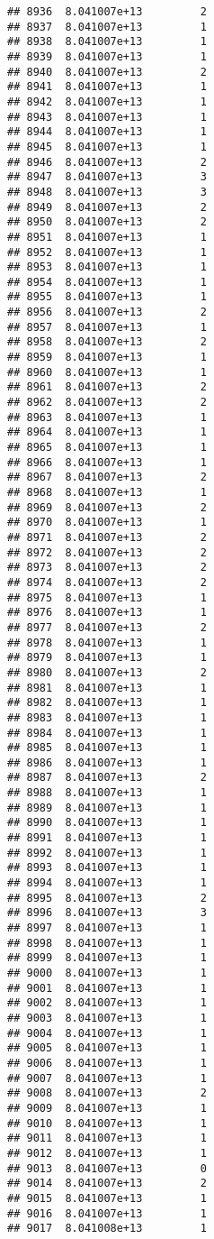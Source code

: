 \documentclass[
]{article}
\begin{document}
\begin{verbatim}
## 8936  8.041007e+13         2
## 8937  8.041007e+13         1
## 8938  8.041007e+13         1
## 8939  8.041007e+13         1
## 8940  8.041007e+13         2
## 8941  8.041007e+13         1
## 8942  8.041007e+13         1
## 8943  8.041007e+13         1
## 8944  8.041007e+13         1
## 8945  8.041007e+13         1
## 8946  8.041007e+13         2
## 8947  8.041007e+13         3
## 8948  8.041007e+13         3
## 8949  8.041007e+13         2
## 8950  8.041007e+13         2
## 8951  8.041007e+13         1
## 8952  8.041007e+13         1
## 8953  8.041007e+13         1
## 8954  8.041007e+13         1
## 8955  8.041007e+13         1
## 8956  8.041007e+13         2
## 8957  8.041007e+13         1
## 8958  8.041007e+13         2
## 8959  8.041007e+13         1
## 8960  8.041007e+13         1
## 8961  8.041007e+13         2
## 8962  8.041007e+13         2
## 8963  8.041007e+13         1
## 8964  8.041007e+13         1
## 8965  8.041007e+13         1
## 8966  8.041007e+13         1
## 8967  8.041007e+13         2
## 8968  8.041007e+13         1
## 8969  8.041007e+13         2
## 8970  8.041007e+13         1
## 8971  8.041007e+13         2
## 8972  8.041007e+13         2
## 8973  8.041007e+13         2
## 8974  8.041007e+13         2
## 8975  8.041007e+13         1
## 8976  8.041007e+13         1
## 8977  8.041007e+13         2
## 8978  8.041007e+13         1
## 8979  8.041007e+13         1
## 8980  8.041007e+13         2
## 8981  8.041007e+13         1
## 8982  8.041007e+13         1
## 8983  8.041007e+13         1
## 8984  8.041007e+13         1
## 8985  8.041007e+13         1
## 8986  8.041007e+13         1
## 8987  8.041007e+13         2
## 8988  8.041007e+13         1
## 8989  8.041007e+13         1
## 8990  8.041007e+13         1
## 8991  8.041007e+13         1
## 8992  8.041007e+13         1
## 8993  8.041007e+13         1
## 8994  8.041007e+13         1
## 8995  8.041007e+13         2
## 8996  8.041007e+13         3
## 8997  8.041007e+13         1
## 8998  8.041007e+13         1
## 8999  8.041007e+13         1
## 9000  8.041007e+13         1
## 9001  8.041007e+13         1
## 9002  8.041007e+13         1
## 9003  8.041007e+13         1
## 9004  8.041007e+13         1
## 9005  8.041007e+13         1
## 9006  8.041007e+13         1
## 9007  8.041007e+13         1
## 9008  8.041007e+13         2
## 9009  8.041007e+13         1
## 9010  8.041007e+13         1
## 9011  8.041007e+13         1
## 9012  8.041007e+13         1
## 9013  8.041007e+13         0
## 9014  8.041007e+13         2
## 9015  8.041007e+13         1
## 9016  8.041007e+13         1
## 9017  8.041008e+13         1

\end{verbatim}
\end{document}
